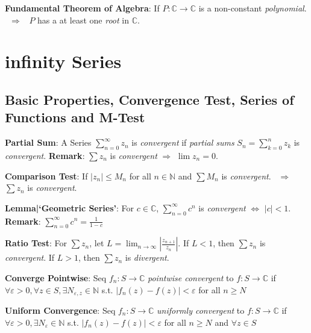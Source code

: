\documentclass[9pt]{article}
\begin{document}
\textbf{Fundamental Theorem of Algebra}: If $P:\mathbb{C}\to\mathbb{C}$ is a non-constant \textit{polynomial}. \ $\Rightarrow$ \ $P$ has a at least one \textit{root} in $\mathbb{C}$.


\section{infinity Series} %

\subsection{Basic Properties, Convergence Test, Series of Functions and M-Test} %

\textbf{Partial Sum}: A Series $\sum_{n=0}^{\infty}z_n$ is \textit{convergent} if \textit{partial sums} $S_n = \sum_{k=0}^{n}z_k$ is \textit{convergent}. \quad \textbf{Remark}: $\sum z_n$ is \textit{convergent} $\Rightarrow$ $\lim z_n=0$.

\textbf{Comparison Test}: If $|z_n|\leq M_n$ for all $n\in\mathbb{N}$ and $\sum M_n$ is \textit{convergent}. \ $\Rightarrow$ \ $\sum z_n$ is \textit{convergent}.

\textbf{Lemma|`Geometric Series'}: For $c\in\mathbb{C}$, $\sum_{n=0}^\infty c^n$ is \textit{convergent} $\Leftrightarrow$ $|c|<1$. \quad \textbf{Remark}: $\sum_{n=0}^\infty c^n=\frac{1}{1-c}$

\textbf{Ratio Test}: {\small For $\sum z_n$, let $L = \lim_{n\to\infty}\left|\frac{z_{n+1}}{z_n}\right|$. \quad If $L<1$, then $\sum z_n$ is \textit{convergent}. \quad If $L>1$, then $\sum z_n$ is \textit{divergent}.} 

\textbf{Converge Pointwise}: {\small Seq $f_n: S\to\mathbb{C}$ \textit{pointwise convergent} to $f:S\to\mathbb{C}$ if \quad $\forall \varepsilon>0, \forall z \in S, \exists N_{\varepsilon,z}\in\mathbb{N}$ s.t. $|f_n(z)-f(z)|<\varepsilon$ for all $n\geq N$}

\textbf{Uniform Convergence}: {\small Seq $f_n: S\to\mathbb{C}$ \textit{uniformly convergent} to $f:S\to\mathbb{C}$ if \quad $\forall \varepsilon>0, \exists N_{\varepsilon}\in\mathbb{N}$ s.t. $|f_n(z)-f(z)|<\varepsilon$ for all $n\geq N$ and $\forall z\in S$}
\end{document}
